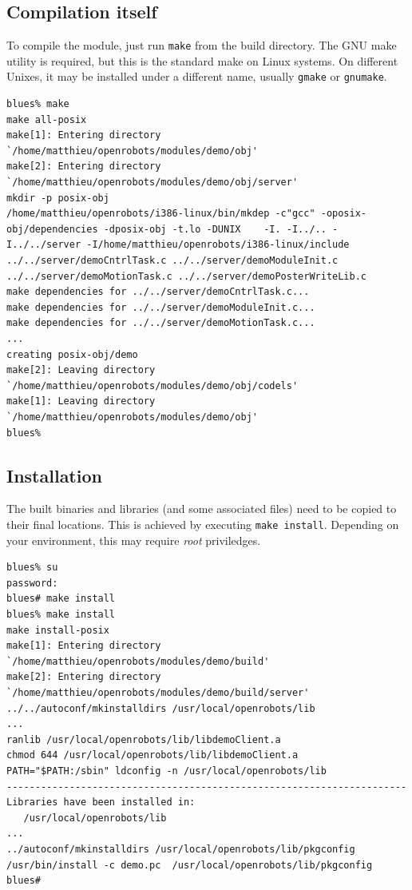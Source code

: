 \subsection{Compilation itself}

To compile the module, just run \texttt{make} from the build directory. The GNU
make utility is required, but this is the standard make on Linux systems. On
different Unixes, it may be installed under a different name, usually
\texttt{gmake} or \texttt{gnumake}.

\begin{center}
\begin{cartouche}\small
\begin{verbatim}
blues% make
make all-posix
make[1]: Entering directory `/home/matthieu/openrobots/modules/demo/obj'
make[2]: Entering directory `/home/matthieu/openrobots/modules/demo/obj/server'
mkdir -p posix-obj
/home/matthieu/openrobots/i386-linux/bin/mkdep -c"gcc" -oposix-obj/dependencies -dposix-obj -t.lo -DUNIX    -I. -I../.. -I../../server -I/home/matthieu/openrobots/i386-linux/include   ../../server/demoCntrlTask.c ../../server/demoModuleInit.c ../../server/demoMotionTask.c ../../server/demoPosterWriteLib.c
make dependencies for ../../server/demoCntrlTask.c...
make dependencies for ../../server/demoModuleInit.c...
make dependencies for ../../server/demoMotionTask.c...
...
creating posix-obj/demo
make[2]: Leaving directory `/home/matthieu/openrobots/modules/demo/obj/codels'
make[1]: Leaving directory `/home/matthieu/openrobots/modules/demo/obj'
blues%
\end{verbatim}
\end{cartouche}
\end{center}

\subsection{Installation}
The built binaries and libraries (and some associated files) need to
be copied to their final locations. This is achieved by executing
\texttt{make install}. Depending on your environment, this may require
\emph{root} priviledges.

\begin{center}
\begin{cartouche}\small
\begin{verbatim}
blues% su
password:
blues# make install
blues% make install
make install-posix
make[1]: Entering directory `/home/matthieu/openrobots/modules/demo/build'
make[2]: Entering directory `/home/matthieu/openrobots/modules/demo/build/server'
../../autoconf/mkinstalldirs /usr/local/openrobots/lib
...
ranlib /usr/local/openrobots/lib/libdemoClient.a
chmod 644 /usr/local/openrobots/lib/libdemoClient.a
PATH="$PATH:/sbin" ldconfig -n /usr/local/openrobots/lib
----------------------------------------------------------------------
Libraries have been installed in:
   /usr/local/openrobots/lib
...
../autoconf/mkinstalldirs /usr/local/openrobots/lib/pkgconfig
/usr/bin/install -c demo.pc  /usr/local/openrobots/lib/pkgconfig
blues# 
\end{verbatim}%
\end{cartouche}
\end{center}
